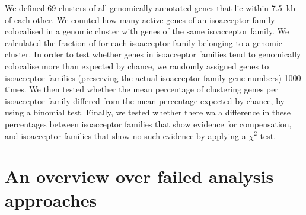 We defined \num{69} clusters of all genomically annotated \trna genes that lie
within \SI{7.5}{kb} of each other. We counted how many active \trna genes of an
isoacceptor family colocalised in a genomic cluster with \trna genes of the same
isoacceptor family. We calculated the fraction of \trna for each isoacceptor
family belonging to a genomic cluster. In order to test whether genes in
isoacceptor families tend to genomically colocalise more than expected by
chance, we randomly assigned \trna genes to isoacceptor families (preserving the
actual isoacceptor family gene numbers) \num{1000} times. We then tested whether
the mean percentage of clustering \trna genes per isoacceptor family differed
from the mean percentage expected by chance, by using a binomial test. Finally,
we tested whether there wa a difference in these percentages between isoacceptor
families that show evidence for compensation, and isoacceptor families that show
no such evidence by applying a \(\chi^2\)-test.

\section{An overview over failed analysis approaches}
